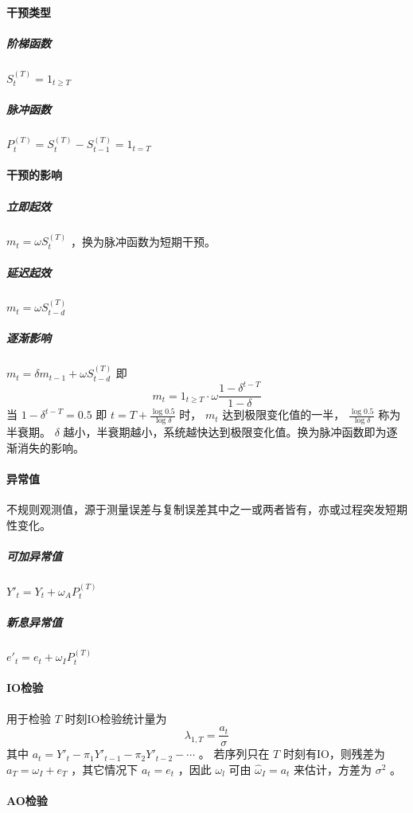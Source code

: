 \documentclass[UTF8,hyperref,a4paper]{ctexart}
\begin{document}
        \paragraph{干预类型} 
        \subparagraph{阶梯函数}  $ S_t^{(T)} = 1_{t \geqslant T} $ 
        \subparagraph{脉冲函数}  $ P_t^{(T)} = S_t^{(T)} - S_{t-1}^{(T)} = 1_{t = T} $ 
        
        \paragraph{干预的影响}
        \subparagraph{立即起效}  $ m_t = \omega S_t^{(T)} $ ，换为脉冲函数为短期干预。
        \subparagraph{延迟起效}  $ m_t = \omega S_{t-d}^{(T)} $ 
        \subparagraph{逐渐影响}  $ m_t = \delta m_{t-1} + \omega S_{t-d}^{(T)} $ 即
        $$ m_t = 1_{t \geqslant T} \cdot \omega \frac{1 - \delta^{t-T}}{1 - \delta} $$ 
        当 $ 1 - \delta^{t-T} = 0.5 $ 即 $ t = T + \frac{\log 0.5}{\log \delta} $  时，
        $ m_t $ 达到极限变化值的一半， $ \frac{\log 0.5}{\log \delta} $ 称为半衰期。
        $ \delta $ 越小，半衰期越小，系统越快达到极限变化值。换为脉冲函数即为逐渐消失的影响。

        \paragraph{异常值} 不规则观测值，源于测量误差与复制误差其中之一或两者皆有，亦或过程突发短期性变化。 
        \subparagraph{可加异常值}  $ Y'_t = Y_t + \omega_A P_t^{(T)} $ 
        \subparagraph{新息异常值} $ e'_t = e_t + \omega_I P_t^{(T)} $ 

        \paragraph{IO检验} 用于检验 $ T $ 时刻IO检验统计量为
        $$ \lambda_{1,T} = \frac{a_t}{\sigma} $$ 
        其中 $ a_t = Y'_t - \pi_1 Y'_{t-1} - \pi_2 Y'_{t-2} - \cdots $ 。
        若序列只在 $ T $ 时刻有IO，则残差为 $ a_T = \omega_I + e_T $ ，其它情况下
        $ a_t = e_t $ ，因此 $ \omega_l $ 可由 $ \hat{\omega}_I = a_t $ 来估计，方差为 $ \sigma^2 $ 。

        \paragraph{AO检验} 

    
\end{document}
